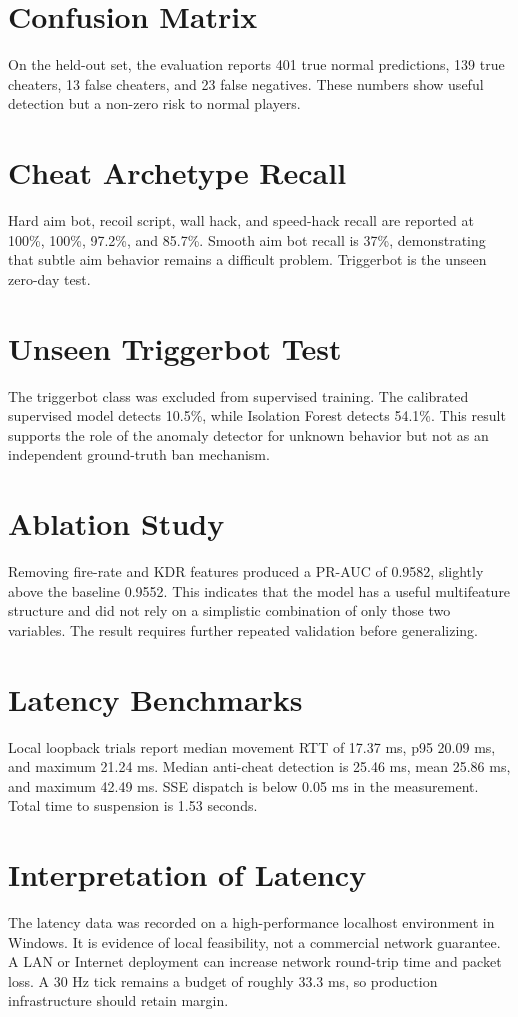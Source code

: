 \documentclass[12pt,a4paper,oneside]{report}
\begin{document}
\section{Confusion Matrix}
On the held-out set, the evaluation reports 401 true normal predictions, 139 true cheaters, 13 false cheaters, and 23 false negatives. These numbers show useful detection but a non-zero risk to normal players.

\section{Cheat Archetype Recall}
Hard aim bot, recoil script, wall hack, and speed-hack recall are reported at 100\%, 100\%, 97.2\%, and 85.7\%. Smooth aim bot recall is 37\%, demonstrating that subtle aim behavior remains a difficult problem. Triggerbot is the unseen zero-day test.

\section{Unseen Triggerbot Test}
The triggerbot class was excluded from supervised training. The calibrated supervised model detects 10.5\%, while Isolation Forest detects 54.1\%. This result supports the role of the anomaly detector for unknown behavior but not as an independent ground-truth ban mechanism.

\section{Ablation Study}
Removing fire-rate and KDR features produced a PR-AUC of 0.9582, slightly above the baseline 0.9552. This indicates that the model has a useful multifeature structure and did not rely on a simplistic combination of only those two variables. The result requires further repeated validation before generalizing.

\section{Latency Benchmarks}
Local loopback trials report median movement RTT of 17.37 ms, p95 20.09 ms, and maximum 21.24 ms. Median anti-cheat detection is 25.46 ms, mean 25.86 ms, and maximum 42.49 ms. SSE dispatch is below 0.05 ms in the measurement. Total time to suspension is 1.53 seconds.

\section{Interpretation of Latency}
The latency data was recorded on a high-performance localhost environment in Windows. It is evidence of local feasibility, not a commercial network guarantee. A LAN or Internet deployment can increase network round-trip time and packet loss. A 30 Hz tick remains a budget of roughly 33.3 ms, so production infrastructure should retain margin.
\end{document}
